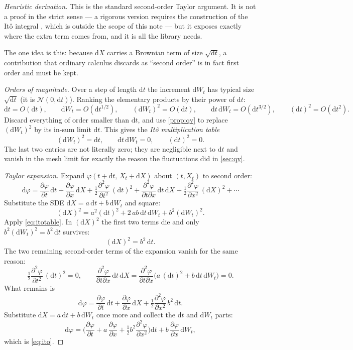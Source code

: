 \documentclass[11pt]{article}
\newcommand{\dd}{\mathrm{d}}           %
\newcommand{\dW}{\dd W_t}              %
\newcommand{\dt}{\dd t}                %
\newcommand{\drift}{a}                 %
\newcommand{\diff}{b}                  %
\theoremstyle{plain}
\theoremstyle{definition}
\theoremstyle{remark}
\begin{document}
\begin{proof}[Heuristic derivation]
This is the standard second-order Taylor argument. It is not a proof in the
strict sense --- a rigorous version requires the construction of the It\^o
integral \cite[Ch.~4]{shreve2004}, which is outside the scope of this note ---
but it exposes exactly where the extra term comes from, and it is all the
library needs.

The one idea is this: because $\dd X$ carries a Brownian term of size
$\sqrt{\dt}$, a contribution that ordinary calculus discards as ``second
order'' is in fact first order and must be kept.

\medskip
\noindent\emph{Orders of magnitude.}\;
Over a step of length $\dt$ the increment $\dW$ has typical size $\sqrt{\dt}$
(it is $\mathcal N(0,\dt)$). Ranking the elementary products by their power of
$\dt$:
\[
  \dt = O(\dt), \qquad
  \dW = O(\dt^{1/2}), \qquad
  (\dW)^2 = O(\dt), \qquad
  \dt\,\dW = O(\dt^{3/2}), \qquad
  (\dt)^2 = O(\dt^2).
\]
Discard everything of order smaller than $\dt$, and use \cref{prop:qv} to
replace $(\dW)^2$ by its in-sum limit $\dt$. This gives the \emph{It\^o
multiplication table}
\begin{equation}\label{eq:itotable}
  (\dW)^2=\dt, \qquad \dt\,\dW=0, \qquad (\dt)^2=0 .
\end{equation}
The last two entries are not literally zero; they are negligible next to $\dt$
and vanish in the mesh limit for exactly the reason the fluctuations did in
\cref{sec:qv}.

\medskip
\noindent\emph{Taylor expansion.}\;
Expand $\varphi(t+\dt,\,X_t+\dd X)$ about $(t,X_t)$ to second order:
\[
  \dd \varphi = \frac{\partial\varphi}{\partial t}\,\dt + \frac{\partial\varphi}{\partial x}\,\dd X
        + \tfrac12 \frac{\partial^2\varphi}{\partial t^2}\,(\dt)^2
        + \frac{\partial^2\varphi}{\partial t\partial x}\,\dt\,\dd X
        + \tfrac12 \frac{\partial^2\varphi}{\partial x^2}\,(\dd X)^2
        + \cdots
\]
Substitute the SDE $\dd X = \drift\,\dt + \diff\,\dW$ and square:
\[
  (\dd X)^2 = \drift^2(\dt)^2 + 2\,\drift\diff\,\dt\,\dW + \diff^2(\dW)^2 .
\]
Apply \eqref{eq:itotable}. In $(\dd X)^2$ the first two terms die and only
$\diff^2(\dW)^2=\diff^2\,\dt$ survives:
\[
  (\dd X)^2 = \diff^2\,\dt .
\]
The two remaining second-order terms of the expansion vanish for the same
reason:
\[
  \tfrac12 \frac{\partial^2\varphi}{\partial t^2}\,(\dt)^2 = 0, \qquad
  \frac{\partial^2\varphi}{\partial t\partial x}\,\dt\,\dd X
     = \frac{\partial^2\varphi}{\partial t\partial x}\big(\drift\,(\dt)^2 + \diff\,\dt\,\dW\big) = 0 .
\]
What remains is
\[
  \dd \varphi = \frac{\partial\varphi}{\partial t}\,\dt + \frac{\partial\varphi}{\partial x}\,\dd X + \tfrac12 \frac{\partial^2\varphi}{\partial x^2}\,\diff^2\,\dt .
\]
Substitute $\dd X = \drift\,\dt + \diff\,\dW$ once more and collect the $\dt$
and $\dW$ parts:
\[
  \dd \varphi = \Big( \frac{\partial\varphi}{\partial t} + \drift\, \frac{\partial\varphi}{\partial x} + \tfrac12 \diff^2 \frac{\partial^2\varphi}{\partial x^2} \Big)\dt
        + \diff\, \frac{\partial\varphi}{\partial x} \,\dW ,
\]
which is \eqref{eq:ito}.
\end{proof}
\end{document}
